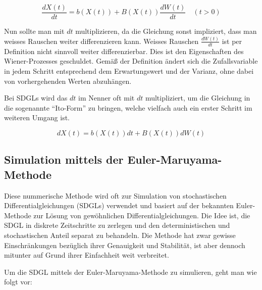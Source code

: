 \begin{equation}
	\frac{dX(t)}{dt} = b(X(t)) + B(X(t)) \frac{dW(t)}{dt} \quad (t>0)
\end{equation}

Nun sollte man mit $ dt $  multiplizieren, da die Gleichung sonst impliziert, dass man weisses Rauschen weiter differenzieren kann. Weisses Rauschen $ \frac{dW(t)}{dt} $ ist per Definition nicht sinnvoll weiter differenzierbar. Dies ist den Eigenschaften des Wiener-Prozesses geschuldet. Gemäß der Definition ändert sich die Zufallsvariable in jedem Schritt entsprechend dem Erwartungswert und der Varianz, ohne dabei von vorhergehenden Werten abzuhängen.

Bei SDGLs wird das $ dt $ im Nenner oft mit $ dt $ multipliziert, um die Gleichung in die sogenannte ``Ito-Form'' zu bringen, welche vielfach auch ein erster Schritt im weiteren Umgang ist.

\begin{equation}
	dX(t) = b(X(t)) dt + B(X(t)) dW(t)
\end{equation}


\subsection{Simulation mittels der Euler-Maruyama-Methode\label{brown:Simulation}}

Diese nummerische Methode wird oft zur Simulation von stochastischen Differentialgleichungen (SDGLs) verwendet und basiert auf der bekannten Euler-Methode zur Lösung von gewöhnlichen Differentialgleichungen. Die Idee ist, die SDGL in diskrete Zeitschritte zu zerlegen und den deterministischen und stochastischen Anteil separat zu behandeln. Die Methode hat zwar gewisse Einschränkungen bezüglich ihrer Genauigkeit und Stabilität, ist aber dennoch mitunter auf Grund ihrer Einfachheit weit verbreitet.




Um die SDGL mittels der Euler-Maruyama-Methode zu simulieren, geht man wie folgt vor:

